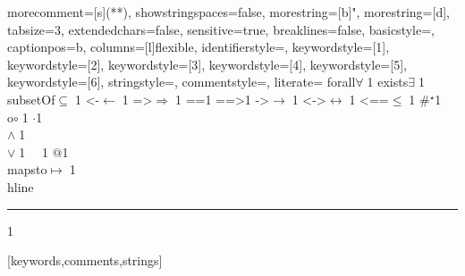 {    %
    morecomment=[s]{(*}{*)},
    showstringspaces=false,
    morestring=[b]",
    morestring=[d],
    tabsize=3,
    extendedchars=false,
    sensitive=true,
    breaklines=false,
    basicstyle=\small,
    captionpos=b,
    columns=[l]flexible,
    identifierstyle={\ttfamily\color{black}},
    keywordstyle=[1]{\ttfamily\color{dkblue}},
    keywordstyle=[2]{\ttfamily\color{dkgreen}},
    keywordstyle=[3]{\ttfamily\color{ltblue}},
    keywordstyle=[4]{\ttfamily\color{dkorange}},
    keywordstyle=[5]{\ttfamily\color{dkred}},
    keywordstyle=[6]{\ttfamily\color{dkviolet}},
    stringstyle=\ttfamily,
    commentstyle={\ttfamily\color{dkgreen}},
    literate=
    {forall}{{$\forall\;$}}1
    {exists}{{$\exists\;$}}1
    {\\subsetOf}{{$\subseteq\;$}}1
    {<-}{{$\leftarrow\;$}}1
    {=>}{{$\Rightarrow\;$}}1
    {==}{{\code{==}\;}}1
    {==>}{{\code{==>}\;}}1
    {->}{{$\rightarrow\;$}}1
    {<->}{{$\leftrightarrow\;$}}1
    {<==}{{$\leq\;$}}1
    {\#}{{$^\star$}}1 
    {\\o}{{$\circ\;$}}1 
    {\@}{{$\cdot$}}1 
    {\/\\}{{$\wedge\;$}}1
    {\\\/}{{$\vee\;$}}1
    {~}{{\ }}1
    {\@\@}{{$@$}}1
    {\\mapsto}{{$\mapsto\;$}}1
    {\\hline}{{\rule{\linewidth}{0.5pt}}}1
}[keywords,comments,strings]